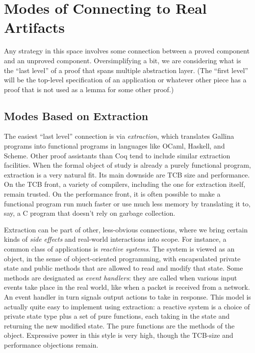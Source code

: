 \documentclass{amsbook}
\theoremstyle{definition}
\theoremstyle{remark}
\numberwithin{section}{chapter}
\numberwithin{equation}{chapter}
\begin{document}
\section{Modes of Connecting to Real Artifacts}

\encoding
Any strategy in this space involves some connection between a proved component and an unproved component.
Oversimplifying a bit, we are considering what is the ``last level'' of a proof that spans multiple abstraction layer.
(The ``first level'' will be the top-level specification of an application or whatever other piece has a proof that is not used as a lemma for some other proof.)

\subsection{Modes Based on Extraction}

The easiest ``last level'' connection is via \emph{extraction}, which translates Gallina programs into functional programs in languages like OCaml, Haskell, and Scheme.
Other proof assistants than Coq tend to include similar extraction facilities.
When the formal object of study is already a purely functional program, extraction is a very natural fit.
Its main downside are TCB size and performance.
On the TCB front, a variety of compilers, including the one for extraction itself, remain trusted.
On the performance front, it is often possible to make a functional program run much faster or use much less memory by translating it to, say, a C program that doesn't rely on garbage collection.

Extraction can be part of other, less-obvious connections, where we bring certain kinds of \emph{side effects} and real-world interactions into scope.
For instance, a common class of applications is \emph{reactive systems}.
The system is viewed as an object, in the sense of object-oriented programming, with encapsulated private state and public methods that are allowed to read and modify that state.
Some methods are designated as \emph{event handlers}: they are called when various input events take place in the real world, like when a packet is received from a network.
An event handler in turn signals output actions to take in response.
This model is actually quite easy to implement using extraction: a reactive system is a choice of private state type plus a set of pure functions, each taking in the state and returning the new modified state.
The pure functions are the methods of the object.
Expressive power in this style is very high, though the TCB-size and performance objections remain.
\end{document}
